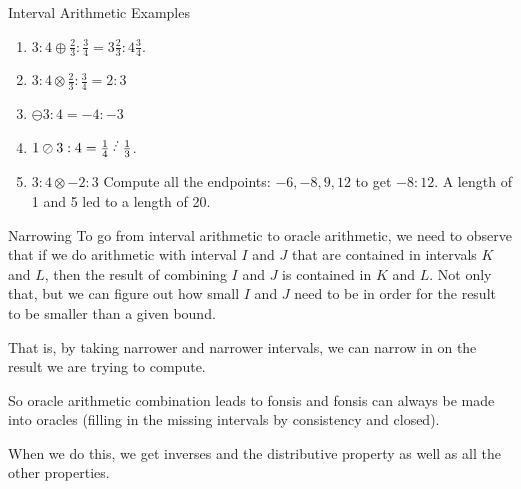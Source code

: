 \documentclass{beamer}
\begin{document}
\begin{frame}{Interval Arithmetic Examples}


    \begin{enumerate}
        \item  $3:4 \oplus \frac{2}{3}:\frac{3}{4} = 3 \frac{2}{3} : 4 \frac{3}{4}$.
        \item  $3:4 \otimes \frac{2}{3}:\frac{3}{4} = 2 : 3$
        \item  $\ominus 3:4 = -4:-3$
        \item  $1\oslash 3:4 = \frac{1}{4} \lte \frac{1}{3}$.
        \item  $3:4 \otimes -2:3$  Compute all the endpoints:  $-6, -8, 9, 12$ to get $-8:12$. A length of 1 and 5 led to a length of 20. 
    \end{enumerate}

\end{frame}

\begin{frame}{Narrowing}
    To go from interval arithmetic to oracle arithmetic, we need to observe that if we do arithmetic with interval $I$ and $J$ that are contained in intervals $K$ and $L$,  then the result of combining $I$ and $J$ is contained in $K$ and $L$. Not only that, but we can figure out how small $I$ and $J$ need to be in order for the result to be smaller than a given bound. 

    That is, by taking narrower and narrower intervals, we can narrow in on the result we are trying to compute. 

    So oracle arithmetic combination leads to fonsis and fonsis can always be made into oracles (filling in the missing intervals by consistency and closed). 

    When we do this, we get inverses and the distributive property as well as all the other properties. 
    
\end{frame}
\end{document}
